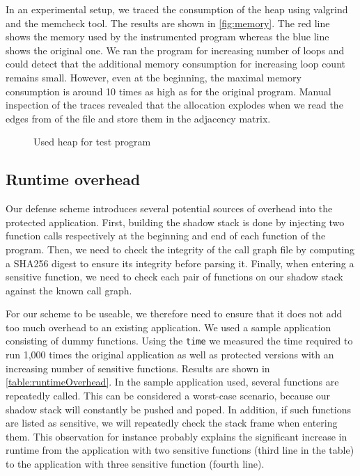 \documentclass{llncs}
\begin{document}
In an experimental setup, we traced the consumption of the heap using valgrind and the memcheck tool. The results are shown in \autoref{fig:memory}. The red line shows the memory used by the instrumented program whereas the blue line shows the original one. We ran the program for increasing number of loops and could detect that the additional memory consumption for increasing loop count remains small. However, even at the beginning, the maximal memory consumption is around 10 times as high as for the original program. Manual inspection of the traces revealed that the allocation explodes when we read the edges from of the file and store them in the adjacency matrix.
\datatable

\begin{figure}
  \centering
  \vspace{-0.4cm}
  \caption{Used heap for test program}
  \label{fig:memory}
  \vspace{-0.4cm}
\end{figure}

\subsection{Runtime overhead}
Our defense scheme introduces several potential sources of overhead into the protected application.
First, building the shadow stack is done by injecting two function calls respectively at the beginning and end of each function of the program.
Then, we need to check the integrity of the call graph file by computing a SHA256 digest to ensure its integrity before parsing it.
Finally, when entering a sensitive function, we need to check each pair of functions on our shadow stack against the known call graph.

For our scheme to be useable, we therefore need to ensure that it does not add too much overhead to an existing application.
We used a sample application consisting of dummy functions. Using the \texttt{time} we measured the time required to run 1,000 times the original application as well as protected versions with an increasing number of sensitive functions.
Results are shown in \autoref{table:runtimeOverhead}. In the sample application used, several functions are repeatedly called. This can be considered a worst-case scenario, because our shadow stack will constantly be pushed and poped.
In addition, if such functions are listed as sensitive, we will repeatedly check the stack frame when entering them. This observation for instance probably explains the significant increase in runtime from the application with two sensitive functions (third line in the table) to the application with three sensitive function (fourth line).
\end{document}
